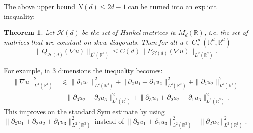 \documentclass[11pt, a4paper, reqno]{elsarticle}
\newtheorem{theorem}{Theorem}[section]
\theoremstyle{definition}
\theoremstyle{remark}
\begin{document}
The above upper bound $N(d)\le 2d-1$
can be turned into an explicit inequality:
\begin{theorem}\label{thm : KornHankel}
 Let $\mathcal H(d)$ be the set of Hankel matrices in $M_d(\mathbb{R})$,
 i.e. the set of matrices that are constant on skew-diagonals.
Then for all $u\in C^\infty_c(\mathbb{R}^d,\mathbb{R}^d)$
\begin{equation}\label{eq : Hankel-Korn}
	\|Q_{\mathcal H(d)}(\nabla u)\|_{L^2(\mathbb{R}^d)}
\le
	C(d)\|P_{\mathcal H(d)}(\nabla u)\|_{L^2(\mathbb{R}^d)}.
\end{equation}
\end{theorem}
For example, in $3$ dimensions the inequality becomes:
\begin{align*}
\|\nabla u\|_{L^2(\mathbb{R}^3)}^2
&\lesssim 
\|\partial_1 u_1\|_{L^2(\mathbb{R}^3)}^2+\|\partial_2 u_1+\partial_1 u_2\|_{L^2(\mathbb{R}^3)}^2+\|\partial_2 u_2\|_{L^2(\mathbb{R}^3)}^2\\ &+\|\partial_3 u_2+\partial_2 u_3\|_{L^2(\mathbb{R}^3)}^2+\|\partial_3 u_1+\partial_2 u_2+\partial_1 u_3\|_{L^2(\mathbb{R}^3)}^2.
\end{align*}
This improves on the standard $\mathrm{Sym}$ estimate
by using $\|\partial_3 u_1+\partial_2 u_2+\partial_1 u_3\|_{L^2(\mathbb{R}^3)}^2$ instead of 
$\|\partial_3 u_1+\partial_1 u_3\|_{L^2(\mathbb{R}^3)}^2
+\|\partial_2 u_2\|_{L^2(\mathbb{R}^3)}^2$.
\end{document}
